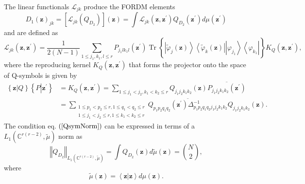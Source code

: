\documentclass[aps,preprint]{revtex4}%
\begin{document}
The linear functionals $\mathcal{L}_{jk}$ produce the FORDM elements
\begin{equation}
D_{1}\left(  \mathbf{z}\right)  _{jk}=\left[  \mathcal{L}_{jk}\left(
Q_{D_{2}}\right)  \right]  \left(  \mathbf{z}\right)  =\int\mathcal{L}%
_{jk}\left(  \mathbf{z,z}^{\prime}\right)  Q_{D_{2}}\left(  \mathbf{z}%
^{\prime}\right)  d\mu\left(  \mathbf{z}^{\prime}\right)  \label{Lij}%
\end{equation}
and are defined as
\[
\mathcal{L}_{jk}\left(  \mathbf{z,z}^{\prime}\right)  =\frac{1}{2\left(
N-1\right)  }\sum_{1\leq j_{1},k_{1},l\leq r}P_{j_{1}lk_{1}l}\left(
\mathbf{z}^{\prime}\right)  \operatorname*{Tr}\left\{  \left\vert
\tilde{\varphi}_{j}\left(  \mathbf{z}\right)  \right\rangle \left\langle
\tilde{\varphi}_{k}\left(  \mathbf{z}\right)  \right\vert
\overset{}{\left\vert \varphi_{j_{1}}\right\rangle \left\langle \varphi
_{k_{1}}\right\vert }\right\}  K_{Q}\left(  \mathbf{z,z}^{\prime}\right)  ,
\]
where the reproducing kernel $K_{Q}\left(  \mathbf{z,z}^{\prime}\right)  $
that forms the projector onto the space of Q-symbols is given by
\begin{align}
\left\{  \mathbf{z}\left\vert Q\right.  \right\}  \left\{  P\left\vert
\mathbf{z}^{\prime}\right.  \right\}   &  =K_{Q}\left(  \mathbf{z,z}^{\prime
}\right)  =\sum_{1\leq j_{1}<j_{2},k_{1}<k_{2}\leq r}Q_{j_{1}j_{2}k_{1}k_{2}%
}\left(  \mathbf{z}\right)  \overline{P_{j_{1}j_{2}k_{1}k_{2}}\left(
\mathbf{z}^{\prime}\right)  }\nonumber\\
&  =\sum_{\substack{1\leq p_{1}<p_{2}\leq r,1\leq q_{1}<q_{2}\leq r\\1\leq
j_{1}<j_{2}\leq r,1\leq k_{1}<k_{2}\leq r}}\overline{Q_{p_{1}p_{2}q_{1}q_{2}%
}\left(  \mathbf{z}^{\prime}\right)  \Delta_{p_{1}p_{2}q_{1}q_{2}j_{1}%
j_{2}k_{1}k_{2}}^{-1}}Q_{j_{1}j_{2}k_{1}k_{2}}\left(  \mathbf{z}\right)  .
\end{align}
The condition eq. $\left(  \ref{QsymNorm}\right)  $ can be expressed in terms
of a $L_{1}\left(  \mathbb{C}^{r\left(  r-2\right)  },\tilde{\mu}\right)  $
norm as
\begin{equation}
\left\Vert Q_{D_{2}}\right\Vert _{L_{1}\left(  \mathbb{C}^{r\left(
r-2\right)  },\tilde{\mu}\right)  }=\int Q_{D_{2}}\left(  \mathbf{z}\right)
d\tilde{\mu}\left(  \mathbf{z}\right)  =\binom{N}{2},
\end{equation}
where
\begin{equation}
\tilde{\mu}\left(  \mathbf{z}\right)  =\left\langle \mathbf{z\left\vert
\mathbf{z}\right.  }\right\rangle d\mu\left(  \mathbf{z}\right)  .
\end{equation}
\end{document}
